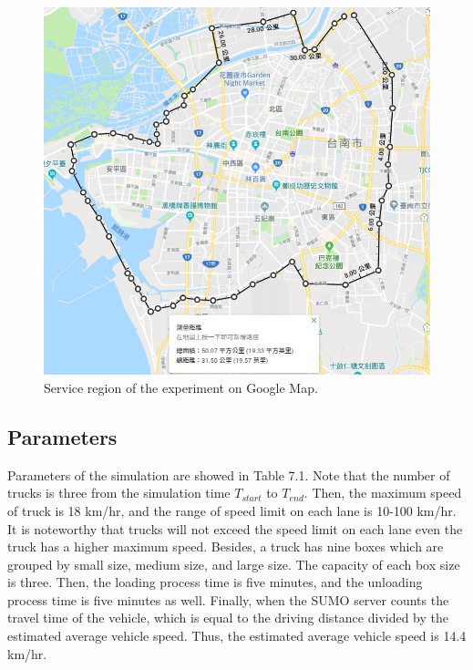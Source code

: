 \documentclass[12pt]{ksthesis}
\begin{document}
\begin{thesis}
{\begin{figure}[H]
\centering
\includegraphics[width=1.0\textwidth]{./Thesis_figures/F7-3_GoogleMap.PNG}
\caption{\large Service region of the experiment on Google Map.}
\vspace{0.5cm}
\label{Fig:GoogleMap}
\end{figure}

\subsection{Parameters}
Parameters of the simulation are showed in Table 7.1. Note that the number of trucks is three from the simulation time $T_{start}$ to $T_{end}$. 
Then, the maximum speed of truck is 18 km/hr, and the range of speed limit on each lane is 10-100 km/hr. It is noteworthy that trucks will not exceed the speed limit on each lane even the truck has a higher maximum speed. Besides, a truck has nine boxes which are grouped by small size, medium size, and large size. The capacity of each box size is three. Then, the loading process time is five minutes, and the unloading process time is five minutes as well. Finally, when the SUMO server counts the travel time of the vehicle, which is equal to the driving distance divided by the estimated average vehicle speed. Thus, the estimated average vehicle speed is 14.4 km/hr.

}
\end{thesis}
\end{document}
